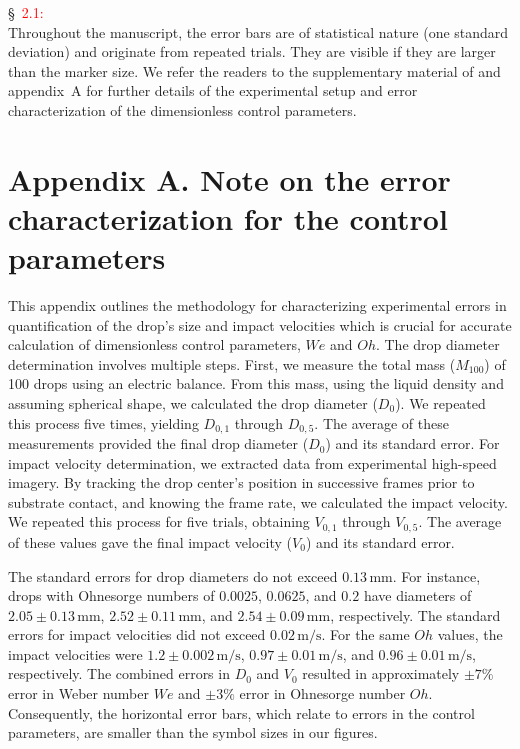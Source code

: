 \documentclass[]{article}
\newcommand*\red{\textcolor{red}}
\newcommand{\oo}{\color{magenta} \normalfont}
\newcommand{\bb}{\color{black} \normalfont}
\begin{document}
\begin{enumerate}
	\S~\red{2.1:}\\
	\oo
	Throughout the manuscript, the error bars are of statistical nature (one standard deviation) and originate from repeated trials. They are visible if they are larger than the marker size.  We refer the readers to the supplementary material of \citet{zhang2022impact}  and appendix~A for further details of the experimental setup and error characterization of the dimensionless control parameters.
	
	\section*{Appendix A. Note on the error characterization for the control parameters}
	\label{app:error}
	This appendix outlines the methodology for characterizing experimental errors in quantification of the drop's size and impact velocities which is crucial for accurate calculation of dimensionless control parameters, $We$ and $Oh$.
	The drop diameter determination involves multiple steps. First, we measure the total mass ($M_{100}$) of 100 drops using an electric balance. From this mass, using the liquid density and assuming spherical shape, we calculated the drop diameter ($D_0$). 
	We repeated this process five times, yielding $D_{0,1}$ through $D_{0,5}$. The average of these measurements provided the final drop diameter ($D_0$) and its standard error.
	For impact velocity determination, we extracted data from experimental high-speed imagery. By tracking the drop center's position in successive frames prior to substrate contact, and knowing the frame rate, we calculated the impact velocity. We repeated this process for five trials, obtaining $V_{0,1}$ through $V_{0,5}$. The average of these values gave the final impact velocity ($V_0$) and its standard error.
	
	The standard errors for drop diameters do not exceed $0.13\,\si{\milli\meter}$. For instance, drops with Ohnesorge numbers of $0.0025$, $0.0625$, and $0.2$ have diameters of $2.05 \pm 0.13\,\si{\milli\meter}$, $2.52 \pm 0.11\,\si{\milli\meter}$, and $2.54 \pm 0.09\,\si{\milli\meter}$, respectively. 
	The standard errors for impact velocities did not exceed $0.02\,\si{\meter}/\si{\second}$. For the same $Oh$ values, the impact velocities were $1.2 \pm 0.002\,\si{\meter}/\si{\second}$, $0.97 \pm 0.01\,\si{\meter}/\si{\second}$, and $0.96 \pm 0.01\,\si{\meter}/\si{\second}$, respectively.
	The combined errors in $D_0$ and $V_0$ resulted in approximately $\pm 7\%$ error in Weber number $We$ and $\pm 3\%$ error in Ohnesorge number $Oh$. Consequently, the horizontal error bars, which relate to errors in the control parameters, are smaller than the symbol sizes in our figures.
	\bb
	

\end{enumerate}
\end{document}
